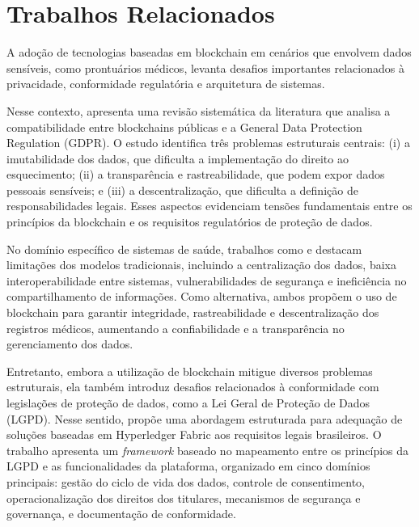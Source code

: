 \chapter[Trabalhos Relacionados]{Trabalhos Relacionados}

A adoção de tecnologias baseadas em blockchain em cenários que envolvem dados sensíveis, como prontuários médicos, levanta desafios importantes relacionados à privacidade, conformidade regulatória e arquitetura de sistemas.

Nesse contexto, \cite{GDPRBlockchainTension} apresenta uma revisão sistemática da literatura que analisa a compatibilidade entre blockchains públicas e a General Data Protection Regulation (GDPR). O estudo identifica três problemas estruturais centrais: (i) a imutabilidade dos dados, que dificulta a implementação do direito ao esquecimento; (ii) a transparência e rastreabilidade, que podem expor dados pessoais sensíveis; e (iii) a descentralização, que dificulta a definição de responsabilidades legais. Esses aspectos evidenciam tensões fundamentais entre os princípios da blockchain e os requisitos regulatórios de proteção de dados.

No domínio específico de sistemas de saúde, trabalhos como \cite{BlockchainVehiclesForEfficientMedicalRecordManagement} e \cite{MedicalRecordSystemUsingBlockchainBigDataAndTokenization} destacam limitações dos modelos tradicionais, incluindo a centralização dos dados, baixa interoperabilidade entre sistemas, vulnerabilidades de segurança e ineficiência no compartilhamento de informações. Como alternativa, ambos propõem o uso de blockchain para garantir integridade, rastreabilidade e descentralização dos registros médicos, aumentando a confiabilidade e a transparência no gerenciamento dos dados.

Entretanto, embora a utilização de blockchain mitigue diversos problemas estruturais, ela também introduz desafios relacionados à conformidade com legislações de proteção de dados, como a Lei Geral de Proteção de Dados (LGPD). Nesse sentido, \cite{BlockGuardLGPDHyperledgerFabric} propõe uma abordagem estruturada para adequação de soluções baseadas em Hyperledger Fabric aos requisitos legais brasileiros. O trabalho apresenta um \textit{framework} baseado no mapeamento entre os princípios da LGPD e as funcionalidades da plataforma, organizado em cinco domínios principais: gestão do ciclo de vida dos dados, controle de consentimento, operacionalização dos direitos dos titulares, mecanismos de segurança e governança, e documentação de conformidade.

